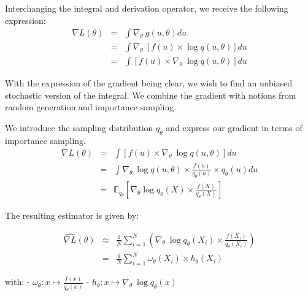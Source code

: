 \bigskip

Interchanging the integral and derivation operator, we receive the following expression: 
$$
\begin{array}{rcl}
\nabla L(\theta) &=& \displaystyle\int \nabla_\theta \ g(u, \theta) du
\\
&=& \displaystyle\int \nabla_\theta \ \left[ f(u) \times \log q(u, \theta) \right] du
\\
&=& \displaystyle\int \left[f(u) \times \nabla_\theta \ \log q(u, \theta) \right] du
\end{array}
$$



With the expression of the gradient being clear, we wish to find an unbiased stochastic version of the integral. We combine the gradient with notions from random generation and importance sampling. 

We introduce the sampling distribution $q_{\theta}$ and express our gradient in terms of importance sampling. 
$$
\begin{array}{rcl}
\nabla L(\theta) &=& \displaystyle\int \left[f(u) \times \nabla_\theta \ \log q(u, \theta) \right] du
\\
&=& \displaystyle\int \nabla_\theta \ \log q(u, \theta) \times \frac{f(u)}{q_\theta(u)} \times q_\theta(u)du
\\
&=& \mathbb E_{q_\theta}\left[ \nabla_\theta \log q_\theta(X) \times \frac{f(X)}{q_\theta(X)} \right]
\end{array}
$$

The resulting estimator is given by:

$$
\begin{array}{rcl}
\widehat{\nabla L}(\theta) 
&\approx& 
\frac 1 N \displaystyle\sum\limits_{i = 1}^N \left( \nabla_\theta \ \log q_\theta (X_i) \times \frac{f(X_i)}{q_\theta(X_i)}\right)
\\
&=& \frac 1 N \displaystyle\sum_{i = 1}^N \omega_\theta(X_i) \times h_\theta(X_i)
\end{array}
$$

with:
- $\omega_\theta : x \mapsto \frac{f(x)}{q_\theta(x)}$
- $h_\theta : x \mapsto \nabla_\theta \ \log q_\theta(x)$
